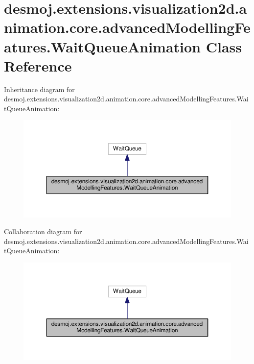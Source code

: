 \section{desmoj.\-extensions.\-visualization2d.\-animation.\-core.\-advanced\-Modelling\-Features.\-Wait\-Queue\-Animation Class Reference}
\label{classdesmoj_1_1extensions_1_1visualization2d_1_1animation_1_1core_1_1advanced_modelling_features_1_1_wait_queue_animation}


Inheritance diagram for desmoj.\-extensions.\-visualization2d.\-animation.\-core.\-advanced\-Modelling\-Features.\-Wait\-Queue\-Animation\-:
\nopagebreak
\begin{figure}[H]
\begin{center}
\leavevmode
\includegraphics[width=350pt]{classdesmoj_1_1extensions_1_1visualization2d_1_1animation_1_1core_1_1advanced_modelling_features05f9eb0ff3c5f37ffac49938981facab}
\end{center}
\end{figure}


Collaboration diagram for desmoj.\-extensions.\-visualization2d.\-animation.\-core.\-advanced\-Modelling\-Features.\-Wait\-Queue\-Animation\-:
\nopagebreak
\begin{figure}[H]
\begin{center}
\leavevmode
\includegraphics[width=350pt]{classdesmoj_1_1extensions_1_1visualization2d_1_1animation_1_1core_1_1advanced_modelling_features06f2c3065ae68af42b60cf135f0e6527}
\end{center}
\end{figure}
